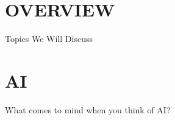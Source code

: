 


\renewcommand{\DeckTitle}{AI, Automation and Open Web Workflows}
\renewcommand{\DeckSubtitle}{Converting scattered knowledge into reusable workflows, diagrams, and publishable web material.}
\renewcommand{\PresenterName}{Rajesh Kumar}
\renewcommand{\PresenterDesignation}{Assistant Professor, Department of Physics}
\renewcommand{\PresenterAffiliation}{Sido Kanhu Murmu University, Dumka, Jharkhand}
\renewcommand{\PresenterDetails}{M.Sc. Physics, IIT Kanpur}
\renewcommand{\PresenterEmail}{kr.rajesh.phy@gmail.com}
\renewcommand{\EventName}{UGC MMTTC Refresher Course}
\renewcommand{\EventDate}{June 2026}
\renewcommand{\DeckTagline}{Refresher Course in Information Technology}
\newcommand{\TitleRightImage}{img/title-image.png}



\PremiumTitleSlide




\section{OVERVIEW}
\begin{frame}{Topics We Will Discuss}
\end{frame}


\section{AI}

\begin{frame}{What comes to mind when you think of AI?}
\end{frame}



